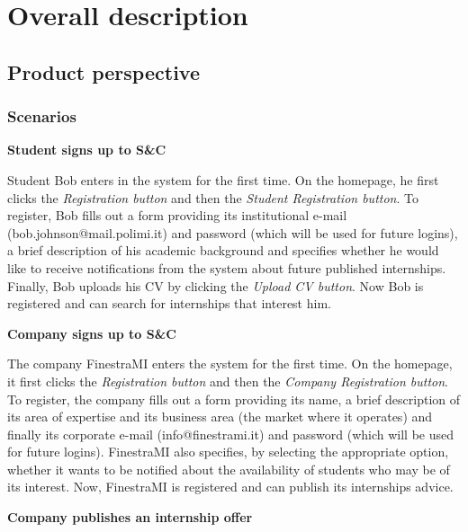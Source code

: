 \chapter{Overall description}
	\section{Product perspective}
		\subsection{Scenarios}
			\textbf{Student signs up to S\&C}
			\begin{flushleft}
				Student Bob enters in the system for the first time. On the homepage, he first clicks the \emph{Registration button} and then the \emph{Student Registration button}. To register, Bob fills out a form providing its institutional e-mail (bob.johnson@mail.polimi.it) and password (which will be used for future logins), a brief description of his academic background and specifies whether he would like to receive notifications from the system about future published internships. Finally, Bob uploads his CV by clicking the \emph{Upload CV button}. Now Bob is registered and can search for internships that interest him.
			\end{flushleft}
			\textbf{Company signs up to S\&C}
			\begin{flushleft}
				The company FinestraMI enters the system for the first time. On the homepage, it first clicks the \emph{Registration button} and then the \emph{Company Registration button}. To register, the company fills out a form providing its name, a brief description of its area of expertise and its business area (the market where it operates) and finally its corporate e-mail (info@finestrami.it) and password (which will be used for future logins). FinestraMI also specifies, by selecting the appropriate option, whether it wants to be notified about the availability of students who may be of its interest. Now, FinestraMI is registered and can publish its internships advice.
			\end{flushleft}
			\textbf{Company publishes an internship offer}
